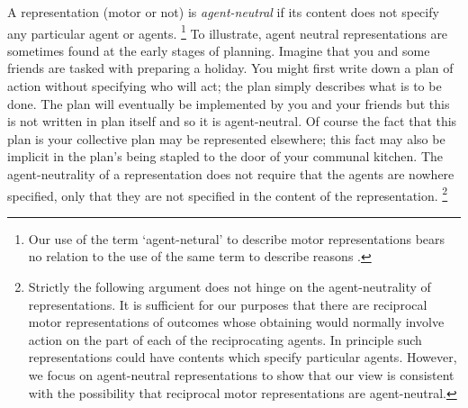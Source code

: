 \documentclass[12pt,\papersize]{extarticle}
\begin{document}
A representation (motor or not) is \emph{agent-neutral} if its content does not specify any particular agent or agents.%
\footnote{
Our use of the term `agent-netural' to describe motor representations bears no relation to the use of the same term  to describe reasons \citep[on the latter, see][]{Parfit:1984fk}.
}
To illustrate, agent neutral representations are sometimes found at the early stages of planning.
Imagine that you and some friends are tasked with preparing a holiday.  
You might first write down a plan of action without specifying who will act; the plan simply describes what is to be done.
The plan  will eventually be implemented by you and your friends
 but this is not written in plan itself  and so it is agent-neutral.
Of course the fact that this plan is your collective plan may be represented elsewhere; this fact may also be implicit in  the plan's being stapled to the door of your communal kitchen.
The agent-neutrality of a representation does not require that the agents are nowhere specified, only that they are not specified in the content of the representation.%
\footnote{
Strictly the following argument does not hinge on the agent-neutrality of representations.
It is sufficient for our purposes that there are reciprocal motor representations  of outcomes whose obtaining would normally involve action on the part of each of the reciprocating agents.
In principle such representations could have contents which specify particular agents. 
However, we focus on agent-neutral representations to show that our view is consistent with the possibility that reciprocal motor representations are agent-neutral. 
}
\end{document}
